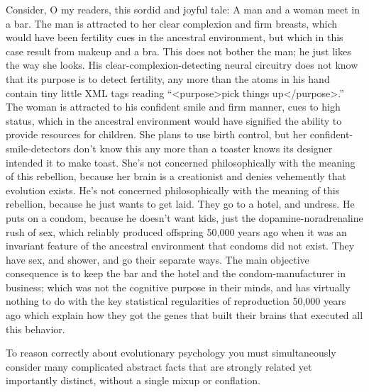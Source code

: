 {
 Consider, O my readers, this sordid and joyful tale: A man and a
woman meet in a bar. The man is attracted to her clear complexion and
firm breasts, which would have been fertility cues in the ancestral
environment, but which in this case result from makeup and a bra. This
does not bother the man; he just likes the way she looks. His
clear-complexion-detecting neural circuitry does not know that its
purpose is to detect fertility, any more than the atoms in his hand
contain tiny little XML tags reading
``{\textless}purpose{\textgreater}pick things
up{\textless}/purpose{\textgreater}.'' The woman is
attracted to his confident smile and firm manner, cues to high status,
which in the ancestral environment would have signified the ability to
provide resources for children. She plans to use birth control, but her
confident-smile-detectors don't know this any more than
a toaster knows its designer intended it to make toast.
She's not concerned philosophically with the meaning of
this rebellion, because her brain is a creationist and denies
vehemently that evolution exists. He's not concerned
philosophically with the meaning of this rebellion, because he just
wants to get laid. They go to a hotel, and undress. He puts on a
condom, because he doesn't want kids, just the
dopamine-noradrenaline rush of sex, which reliably produced offspring
50,000 years ago when it was an invariant feature of the ancestral
environment that condoms did not exist. They have sex, and shower, and
go their separate ways. The main objective consequence is to keep the
bar and the hotel and the condom-manufacturer in business; which was
not the cognitive purpose in their minds, and has virtually nothing to
do with the key statistical regularities of reproduction 50,000 years
ago which explain how they got the genes that built their brains that
executed all this behavior.}

{
 To reason correctly about evolutionary psychology you must
simultaneously consider many complicated abstract facts that are
strongly related yet importantly distinct, without a single mixup or
conflation.}

\myendsectiontext


